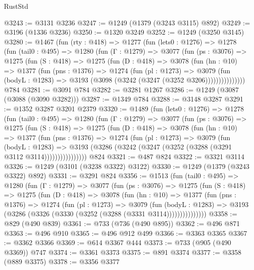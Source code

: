 \begin{lexlean}{RustStd}
\begin{coremodule}
{\begin{coremodule}
{{{{{{{{{{{@3243 := @3131 @3236
@3247 := @1249 (@1379 (@3243 @3115) @892)
@3249 := @3196 (@1336 @3236)
@3250 := @1320 @3249
@3252 := @1249 (@3250 @3145)
@3280 := @1467
    (fun (rty : @418) =>
    @1277
      (fun (lets0 : @1276) =>
      @1278
        (fun (tail0 : @495) =>
        @1280
          (fun (Γ : @1279) =>
          @3077
            (fun (ps : @3076) =>
            @1275
              (fun (S : @418) =>
              @1275
                (fun (D : @418) =>
                @3078
                  (fun (hn : @10) =>
                  @1377
                    (fun (pns : @1376) =>
                    @1274
                      (fun (pl : @1273) =>
                      @3079
                        (fun (bodyL : @1283) =>
                        @3193 (@3098 (@3242 (@3247 (@3252 @3206)))))))))))))))
    @784
@3281 := @3091 @784
@3282 := @3281 @1267
@3286 := @1249 (@3087 (@3088 (@3090 @3282)))
@3287 := @1349 @784
@3288 := @3148 @3287
@3291 := @1352 @3287 @3201 @2379
@3320 := @1489
    (fun (lets0 : @1276) =>
    @1278
      (fun (tail0 : @495) =>
      @1280
        (fun (Γ : @1279) =>
        @3077
          (fun (ps : @3076) =>
          @1275
            (fun (S : @418) =>
            @1275
              (fun (D : @418) =>
              @3078
                (fun (hn : @10) =>
                @1377
                  (fun (pns : @1376) =>
                  @1274
                    (fun (pl : @1273) =>
                    @3079
                      (fun (bodyL : @1283) =>
                      @3193 (@3286 (@3242 (@3247 (@3252 (@3288 (@3291 @3112 @3114))))))))))))))))
    @824
@3321 := @487 @824
@3322 := @3321 @3114
@3326 := @1249 (@3101 (@3238 @3322) @3122)
@3330 := @1249 (@1379 (@3243 @3322) @892)
@3331 := @3291 @824
@3356 := @1513
    (fun (tail0 : @495) =>
    @1280
      (fun (Γ : @1279) =>
      @3077
        (fun (ps : @3076) =>
        @1275
          (fun (S : @418) =>
          @1275
            (fun (D : @418) =>
            @3078
              (fun (hn : @10) =>
              @1377
                (fun (pns : @1376) =>
                @1274
                  (fun (pl : @1273) =>
                  @3079
                    (fun (bodyL : @1283) =>
                    @3193 (@3286 (@3326 (@3330 (@3252 (@3288 (@3331 @3114)))))))))))))))
@3358 := @829 (@490 @839)
@3361 := @733 (@736 (@490 @895))
@3362 := @496 @871
@3363 := @496 @910
@3365 := @496 @912 @499
@3366 := @3363 @3365
@3367 := @3362 @3366
@3369 := @614 @3367 @444
@3373 := @733 (@905 (@490 @3369)) @747
@3374 := @3361 @3373
@3375 := @891 @3374
@3377 := @3358 (@889 @3375)
@3378 := @3356 @3377
}}}}}}}}}}}
\end{coremodule}}
\end{coremodule}
\end{lexlean}
